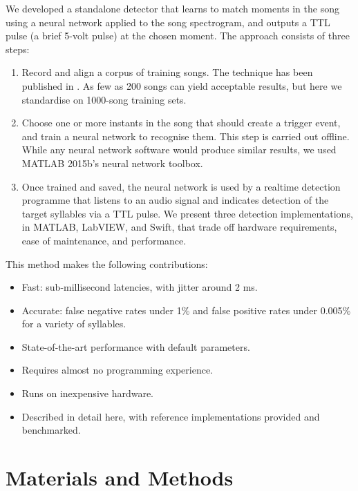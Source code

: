 \documentclass[10pt,letterpaper]{article}
\begin{document}
We developed a standalone detector that learns to match moments in the
song using a neural network applied to the song spectrogram, and
outputs a TTL pulse (a brief 5-volt pulse) at the chosen moment. The
approach consists of three steps:

\begin{enumerate}
\item Record and align a corpus of training songs.  The technique has
  been published in \cite{Poole2012}. As few as 200 songs can yield
  acceptable results, but here we standardise on 1000-song training
  sets.
\item Choose one or more instants in the song that should create a trigger event, and train a
  neural network to recognise them. This step is carried out offline.  While any neural network software would produce similar results, we used MATLAB 2015b's neural network toolbox.
\item Once trained and saved, the neural network is used by a realtime
  detection programme that listens to an audio signal and indicates detection of the target
  syllables via a TTL pulse.  We present three detection implementations, in MATLAB, LabVIEW, and Swift, that trade off hardware requirements, ease of maintenance, and performance.
\end{enumerate}
This method makes the following contributions:
\begin{itemize}
\item Fast: sub-millisecond latencies, with jitter around 2 ms.
\item Accurate: false negative rates under 1\% and false positive rates under 0.005\% for a variety of syllables.
\item State-of-the-art performance with default parameters.
\item Requires almost no programming experience.
\item Runs on inexpensive hardware.
\item Described in detail here, with reference implementations provided and benchmarked.
\end{itemize}



\section{Materials and Methods}
\label{sec:method}
\end{document}
